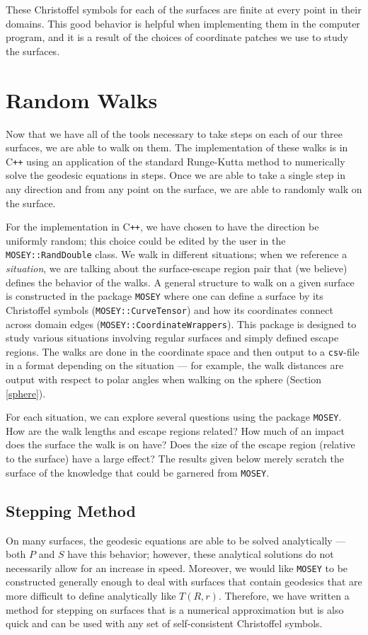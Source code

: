 \documentclass[12pt]{article}
\newcommand{\MOSEY}{\texttt{MOSEY}}
\begin{document}
		These Christoffel symbols for each of the surfaces are finite at every point in their domains.
		This good behavior is helpful when implementing them in the computer program, and it is a result of the choices of coordinate patches we use to study the surfaces.
	
\section{Random Walks}
	Now that we have all of the tools necessary to take steps on each of our three surfaces, we are able to walk on them.
	The implementation of these walks is in C\texttt{++} using an application of the standard Runge-Kutta method to numerically solve the geodesic equations in steps.
	Once we are able to take a single step in any direction and from any point on the surface, we are able to randomly walk on the surface.
	
	For the implementation in C\texttt{++}, we have chosen to have the direction be uniformly random; this choice could be edited by the user in the \texttt{MOSEY::RandDouble} class.
	We walk in different situations; when we reference a \emph{situation}, we are talking about the surface-escape region pair that (we believe) defines the behavior of the walks.
	A general structure to walk on a given surface is constructed in the package \MOSEY{} where one can define a surface by its Christoffel symbols (\texttt{MOSEY::CurveTensor}) and how its coordinates connect across domain edges (\texttt{MOSEY::CoordinateWrappers}).
	This package is designed to study various situations involving regular surfaces and simply defined escape regions.
	The walks are done in the coordinate space and then output to a \texttt{csv}-file in a format depending on the situation --- for example, the walk distances are output with respect to polar angles when walking on the sphere (Section \ref{sphere}).
	
	For each situation, we can explore several questions using the package \MOSEY{}.
	How are the walk lengths and escape regions related?
	How much of an impact does the surface the walk is on have?
	Does the size of the escape region (relative to the surface) have a large effect? The results given below merely scratch the surface of the knowledge that could be garnered from \MOSEY{}.
	
	\subsection{Stepping Method}
		On many surfaces, the geodesic equations are able to be solved analytically --- both $P$ and $S$ have this behavior; however, these analytical solutions do not necessarily allow for an increase in speed.
		Moreover, we would like \MOSEY{} to be constructed generally enough to deal with surfaces that contain geodesics that are more difficult to define analytically like $T(R,r)$.
		Therefore, we have written a method for stepping on surfaces that is a numerical approximation but is also quick and can be used with any set of self-consistent Christoffel symbols.
		
\end{document}
